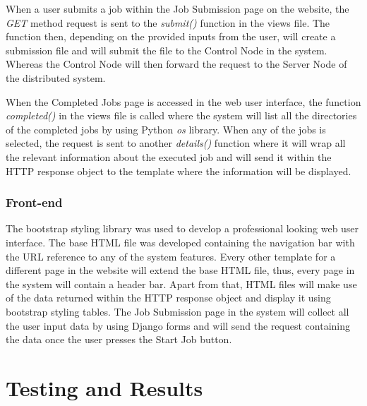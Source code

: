 \documentclass[10pt]{report}
\begin{document}
When a user submits a job within the Job Submission page on the website, the \textit{GET} method request is sent to the \textit{submit()} function in the views file. The function then, depending on the provided inputs from the user, will create a submission file and will submit the file to the Control Node in the system. Whereas the Control Node will then forward the request to the Server Node of the distributed system.
\newline

When the Completed Jobs page is accessed in the web user interface, the function \textit{completed()} in the views file is called where the system will list all the directories of the completed jobs by using Python \textit{os} library. When any of the jobs is selected, the request is sent to another \textit{details()} function where it will wrap all the relevant information about the executed job and will send it within the HTTP response object to the template where the information will be displayed.

\subsection{Front-end}

The bootstrap styling library was used to develop a professional looking web user interface. The base HTML file was developed containing the navigation bar with the URL reference to any of the system features. Every other template for a different page in the website will extend the base HTML file, thus, every page in the system will contain a header bar. Apart from that, HTML files will make use of the data returned within the HTTP response object and display it using bootstrap styling tables. The Job Submission page in the system will collect all the user input data by using Django forms and will send the request containing the data once the user presses the Start Job button.



\chapter{Testing and Results}
\end{document}
